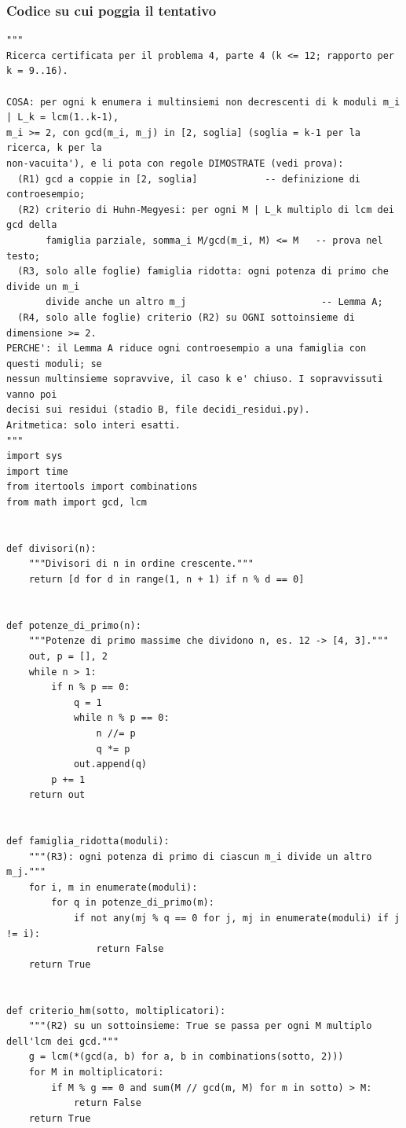 \documentclass[11pt,a4paper]{article}
\begin{document}
\subsubsection{Codice su cui poggia il tentativo}
\begin{lstlisting}[caption={attempt\_001 code\_1 [python, rigore exact] — Stage A (certificate): enumerate non-decreasing k-tuples of divisors of L\_k with pairwise  — verdetto del Referee: UNKNOWN\_STATUS}]
"""
Ricerca certificata per il problema 4, parte 4 (k <= 12; rapporto per k = 9..16).

COSA: per ogni k enumera i multinsiemi non decrescenti di k moduli m_i | L_k = lcm(1..k-1),
m_i >= 2, con gcd(m_i, m_j) in [2, soglia] (soglia = k-1 per la ricerca, k per la
non-vacuita'), e li pota con regole DIMOSTRATE (vedi prova):
  (R1) gcd a coppie in [2, soglia]            -- definizione di controesempio;
  (R2) criterio di Huhn-Megyesi: per ogni M | L_k multiplo di lcm dei gcd della
       famiglia parziale, somma_i M/gcd(m_i, M) <= M   -- prova nel testo;
  (R3, solo alle foglie) famiglia ridotta: ogni potenza di primo che divide un m_i
       divide anche un altro m_j                        -- Lemma A;
  (R4, solo alle foglie) criterio (R2) su OGNI sottoinsieme di dimensione >= 2.
PERCHE': il Lemma A riduce ogni controesempio a una famiglia con questi moduli; se
nessun multinsieme sopravvive, il caso k e' chiuso. I sopravvissuti vanno poi
decisi sui residui (stadio B, file decidi_residui.py).
Aritmetica: solo interi esatti.
"""
import sys
import time
from itertools import combinations
from math import gcd, lcm


def divisori(n):
    """Divisori di n in ordine crescente."""
    return [d for d in range(1, n + 1) if n % d == 0]


def potenze_di_primo(n):
    """Potenze di primo massime che dividono n, es. 12 -> [4, 3]."""
    out, p = [], 2
    while n > 1:
        if n % p == 0:
            q = 1
            while n % p == 0:
                n //= p
                q *= p
            out.append(q)
        p += 1
    return out


def famiglia_ridotta(moduli):
    """(R3): ogni potenza di primo di ciascun m_i divide un altro m_j."""
    for i, m in enumerate(moduli):
        for q in potenze_di_primo(m):
            if not any(mj % q == 0 for j, mj in enumerate(moduli) if j != i):
                return False
    return True


def criterio_hm(sotto, moltiplicatori):
    """(R2) su un sottoinsieme: True se passa per ogni M multiplo dell'lcm dei gcd."""
    g = lcm(*(gcd(a, b) for a, b in combinations(sotto, 2)))
    for M in moltiplicatori:
        if M % g == 0 and sum(M // gcd(m, M) for m in sotto) > M:
            return False
    return True



\end{lstlisting}
\end{document}
